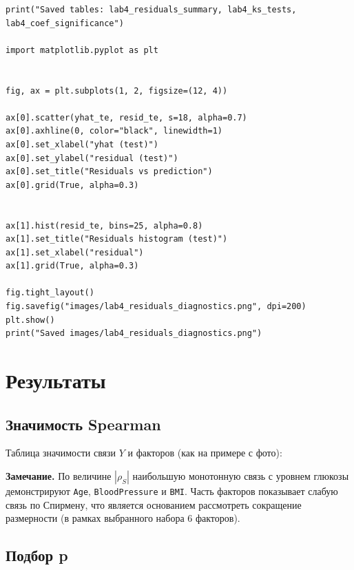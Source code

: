 \documentclass[a4paper, 14pt]{extarticle}
\begin{document}
\begin{longlisting}
\begin{verbatim}
print("Saved tables: lab4_residuals_summary, lab4_ks_tests, lab4_coef_significance")

import matplotlib.pyplot as plt


fig, ax = plt.subplots(1, 2, figsize=(12, 4))

ax[0].scatter(yhat_te, resid_te, s=18, alpha=0.7)
ax[0].axhline(0, color="black", linewidth=1)
ax[0].set_xlabel("yhat (test)")
ax[0].set_ylabel("residual (test)")
ax[0].set_title("Residuals vs prediction")
ax[0].grid(True, alpha=0.3)


ax[1].hist(resid_te, bins=25, alpha=0.8)
ax[1].set_title("Residuals histogram (test)")
ax[1].set_xlabel("residual")
ax[1].grid(True, alpha=0.3)

fig.tight_layout()
fig.savefig("images/lab4_residuals_diagnostics.png", dpi=200)
plt.show()
print("Saved images/lab4_residuals_diagnostics.png")

\end{verbatim}
\end{longlisting}

\section{Результаты}

\subsection{Значимость Spearman}
Таблица значимости связи $Y$ и факторов (как на примере с фото):
\begin{table}[H]
\centering
\scriptsize

\caption{Проверка значимости коэффициента Спирмена для $Y$ и $X_j$ ($\alpha=0.05$).}
\end{table}

\textbf{Замечание.} По величине $|\rho_S|$ наибольшую монотонную связь с уровнем глюкозы демонстрируют
\texttt{Age}, \texttt{BloodPressure} и \texttt{BMI}. Часть факторов показывает слабую связь по Спирмену, что
является основанием рассмотреть сокращение размерности (в рамках выбранного набора 6 факторов).

\subsection{Подбор p}
\begin{table}[H]
\centering
\scriptsize
\resizebox{\textwidth}{!}{}
\caption{Перебор размерности p и выбор минимального числа признаков, при котором качество не хуже лучшего (в т.ч. по RMSE).}
\end{table}
\end{document}

